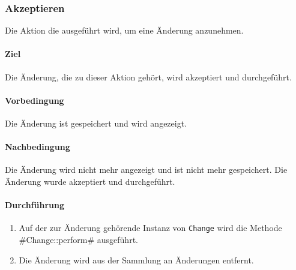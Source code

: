 \subsubsection{Akzeptieren}

Die Aktion die ausgeführt wird, um eine Änderung anzunehmen.

\paragraph*{Ziel}
Die Änderung, die zu dieser Aktion gehört, wird akzeptiert und durchgeführt.

\paragraph*{Vorbedingung}
Die Änderung ist gespeichert und wird angezeigt.

\paragraph*{Nachbedingung}
Die Änderung wird nicht mehr angezeigt und ist nicht mehr gespeichert. Die Änderung wurde akzeptiert und durchgeführt.

\paragraph*{Durchführung}
\begin{enumerate}
    \item Auf der zur Änderung gehörende Instanz von \verb#Change# wird die Methode \ver#Change::perform# ausgeführt.
    \item Die Änderung wird aus der Sammlung an Änderungen entfernt.
\end{enumerate}